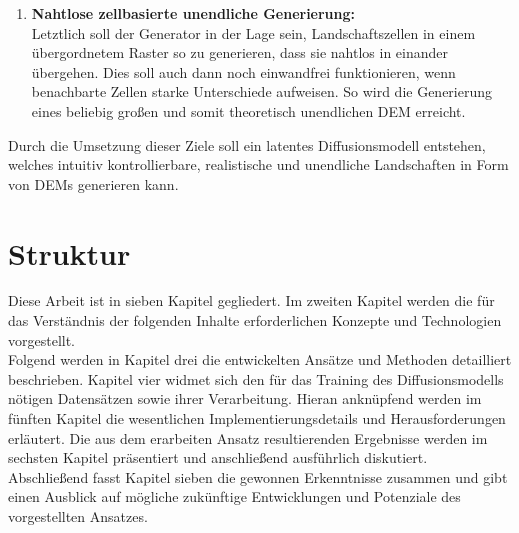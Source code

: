 \begin{enumerate}
    \item \textbf {Nahtlose zellbasierte unendliche Generierung:} \\
    Letztlich soll der Generator in der Lage sein, Landschaftszellen in einem übergordnetem Raster so zu generieren, dass sie nahtlos in einander übergehen. Dies soll auch dann noch einwandfrei funktionieren, wenn benachbarte Zellen starke Unterschiede aufweisen. So wird die Generierung eines beliebig großen und somit theoretisch unendlichen \ac{DEM} erreicht.
     
\end{enumerate}

Durch die Umsetzung dieser Ziele soll ein latentes Diffusionsmodell entstehen, welches intuitiv kontrollierbare, realistische und unendliche Landschaften in Form von \ac{DEM}s generieren kann.

\clearpage

\section{Struktur}

Diese Arbeit ist in sieben Kapitel gegliedert. Im zweiten Kapitel werden die für das Verständnis der folgenden Inhalte erforderlichen Konzepte und Technologien vorgestellt. \\
Folgend werden in Kapitel drei die entwickelten Ansätze und Methoden detailliert beschrieben. Kapitel vier widmet sich den für das Training des Diffusionsmodells nötigen Datensätzen sowie ihrer Verarbeitung. Hieran anknüpfend werden im fünften Kapitel die wesentlichen Implementierungsdetails und Herausforderungen erläutert. Die aus dem erarbeiten Ansatz resultierenden Ergebnisse werden im sechsten Kapitel präsentiert und anschließend ausführlich diskutiert. \\
Abschließend fasst Kapitel sieben die gewonnen Erkenntnisse zusammen und gibt einen Ausblick auf mögliche zukünftige Entwicklungen und Potenziale des vorgestellten Ansatzes.